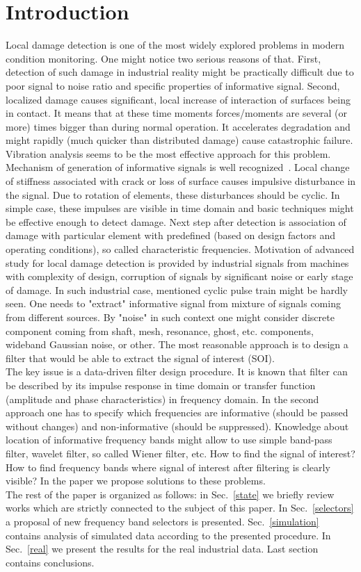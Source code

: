 \documentclass[3p,times]{elsarticle}
\begin{document}
\section{Introduction}
Local damage detection is one of the most widely explored problems in modern condition monitoring. One might notice two serious reasons of that. First, detection of such damage in industrial reality might be practically difficult due to poor signal to noise ratio and specific properties of informative signal. Second, localized damage causes significant, local increase of interaction of surfaces being in contact. It means that at these time moments forces/moments are several (or more) times bigger than during normal operation. It accelerates degradation and might rapidly (much quicker than distributed damage) cause catastrophic failure. Vibration analysis seems to be the most effective approach for this problem. Mechanism of generation of informative signals is well recognized~\cite{bib13,bib18,bib19,bib36}. Local change of stiffness associated with crack or loss of surface causes impulsive disturbance in the signal. Due to rotation of elements, these disturbances should be cyclic. In simple case, these impulses are visible in time domain and basic techniques might be effective enough to detect damage. Next step after detection is association of damage with particular element with predefined (based on design factors and operating conditions), so called characteristic frequencies. Motivation of advanced study for local damage detection is provided by industrial signals from machines with complexity of design, corruption of signals by significant noise or early stage of damage. In such industrial case, mentioned cyclic pulse train might be hardly seen. One needs to "extract" informative signal from mixture of signals coming from different sources. By "noise" in such context one might consider discrete component coming from shaft, mesh, resonance, ghost, etc. components, wideband Gaussian noise, or other. The most reasonable approach is to design a filter that would be able to extract the signal of interest (SOI).\\
The key issue is a data-driven filter design procedure. It is known that filter can be described by its impulse response in time domain or transfer function (amplitude and phase characteristics) in frequency domain. In the second approach one has to specify which frequencies are informative (should be passed without changes) and non-informative (should be suppressed). Knowledge about location of informative frequency bands might allow to use simple band-pass filter, wavelet filter, so called Wiener filter, etc.  How to find the signal of interest? How to find frequency bands where signal of interest after filtering is clearly visible? In the paper we propose solutions to these problems.\\
The rest of the paper is organized as follows: in Sec.~\ref{state} we briefly review works which are strictly connected to the subject of this paper. In Sec.~\ref{selectors} a proposal of new frequency band selectors is presented. Sec.~\ref{simulation} contains analysis of simulated data according to the presented procedure. In Sec.~\ref{real} we present the results for the real industrial data. Last section contains conclusions.
\end{document}
